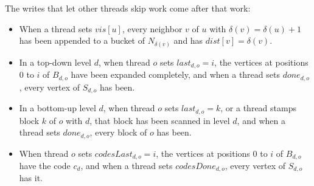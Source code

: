 \begin{lemma}[Certificates]
\label{lem:certs}
The writes that let other threads skip work come after that work:
\begin{itemize}
    \item[(a)] When a thread sets $\mathit{vis}[u]$, every neighbor $v$ of $u$ with $\delta(v) = \delta(u) + 1$ has been appended to a bucket of $N_{\delta(v)}$ and has $\mathit{dist}[v] = \delta(v)$.
    \item[(b)] In a top-down level $d$, when thread $o$ sets $\mathit{last}_{d,o} = i$, the vertices at positions $0$ to $i$ of $B_{d,o}$ have been expanded completely, and when a thread sets $\mathit{done}_{d,o}$, every vertex of $S_{d,o}$ has been.
    \item[(c)] In a bottom-up level $d$, when thread $o$ sets $\mathit{last}_{d,o} = k$, or a thread stamps block $k$ of $o$ with $d$, that block has been scanned in level $d$, and when a thread sets $\mathit{done}_{d,o}$, every block of $o$ has been.
    \item[(d)] When thread $o$ sets $\mathit{codesLast}_{d,o} = i$, the vertices at positions $0$ to $i$ of $B_{d,o}$ have the code $c_d$, and when a thread sets $\mathit{codesDone}_{d,o}$, every vertex of $S_{d,o}$ has it.
\end{itemize}
\end{lemma}
